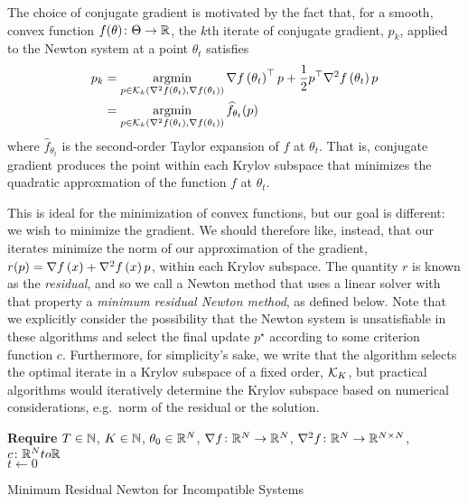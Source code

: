 \documentclass[../../thesis.tex]{subfiles}
\begin{document}
The choice of conjugate gradient is motivated
by the fact that, for a smooth, convex
function $f(\theta) \colon \Theta \to \mathbb{R}$,
the $k$th iterate of conjugate gradient, $p_k$,
applied to the Newton system at a point $\theta_t$ satisfies
\begin{align}
	p_k
	&= \mathop{\mathrm{argmin}}_{p \in {\mathcal{K}}_k\left(\nabla^2f\left(\theta_t\right), \nabla f\left(\theta_t\right)\right)}
	\nabla f\left(\theta_t\right)^\top p + \frac{1}{2} p^\top\nabla^2f\left(\theta_t\right)p\\
	&= \mathop{\mathrm{argmin}}_{p \in {\mathcal{K}}_k\left(\nabla^2f\left(\theta_t\right), \nabla f\left(\theta_t\right)\right)}
	\widehat{f}_{\theta_t}(p)
\end{align}
\noindent where $\hat{f}_{\theta_t}$
is the second-order Taylor expansion of $f$
at $\theta_t$.
That is, conjugate gradient produces
the point within each Krylov subspace
that minimizes the quadratic approxmation
of the function $f$ at $\theta_t$.

This is ideal for the minimization of convex functions,
but our goal is different:
we wish to minimize the gradient.
We should therefore like, instead,
that our iterates minimize
the norm of our approximation of the gradient,
$r(p) = \nabla f\left(x\right) + \nabla^2f\left(x\right)p$,
within each Krylov subspace.
The quantity $r$ is known as the \emph{residual},
and so we call a Newton method that uses
a linear solver with that property
a \emph{minimum residual Newton method},
as defined below.
Note that we explicitly consider
the possibility that the Newton system is unsatisfiable
in these algorithms and select the final update $p^\star{}$
according to some criterion function $c$.
Furthermore, for simplicity's sake,
we write that the algorithm selects the optimal
iterate in a Krylov subspace of a fixed order,
${\mathcal{K}}_K$, but practical algorithms
would iteratively determine  the Krylov subspace
based on numerical considerations,
e.g.~norm of the residual or the solution.
\\
\begin{algorithm}[H]
    \SetAlgoLined{}
    \textbf{Require}
    $T\in \mathbb{N}$, $K \in \mathbb{N}$, $\theta_0 \in \mathbb{R}^N$,
    $\nabla{f}\colon\mathbb{R}^N\to\mathbb{R}^N$,
    $\nabla^2{f}\colon\mathbb{R}^N\to\mathbb{R}^{N\times N}$,
    $c\colon \mathbb{R}^N to \mathbb{R}$\\
    $t \leftarrow 0$\\
    \caption{Minimum Residual Newton for Incompatible Systems}
\end{algorithm}
\end{document}
